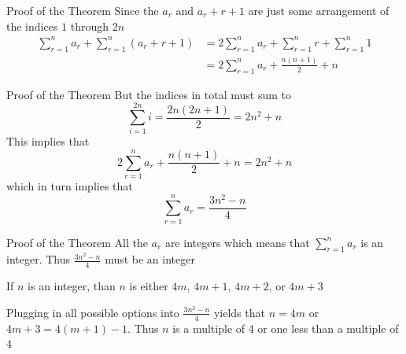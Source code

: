 \documentclass[aspectratio=169]{beamer}
\begin{document}
\begin{frame}{Proof of the Theorem}
    Since the $a_r$ and $a_r + r + 1$ are just some arrangement of the indices $1$ through $2n$
    \begin{align*}
        \sum_{r = 1}^n a_r + \sum_{r = 1}^n (a_r + r + 1) &= 2 \sum_{r = 1}^n a_r + \sum_{r = 1}^n r + \sum_{r = 1}^n 1 \\
        &= 2 \sum_{r = 1}^n a_r + \frac{n(n + 1)}{2} + n
    \end{align*}
\end{frame}

\begin{frame}{Proof of the Theorem}
    But the indices in total must sum to
    \[
        \sum_{i = 1}^{2n} i = \frac{2n(2n + 1)}{2} = 2n^2 + n
    \] \pause
    This implies that
    \[
        2 \sum_{r = 1}^n a_r + \frac{n(n + 1)}{2} + n = 2n^2 + n
    \] \pause
    which in turn implies that
    \[
        \sum_{r = 1}^n a_r = \frac{3n^2 - n}{4}
    \]
\end{frame}

\begin{frame}{Proof of the Theorem}
    All the $a_r$ are integers which means that $\sum_{r = 1}^n a_r$ is an integer. Thus $\frac{3n^2 - n}{4}$ must be an integer
    \vspace{20pt}
    \pause
    
    If $n$ is an integer, than $n$ is either $4m$, $4m + 1$, $4m + 2$, or $4m + 3$
    \vspace{20pt}
    \pause
    
    Plugging in all possible options into $\frac{3n^2 - n}{4}$ yields that $n = 4m$ or $4m + 3 = 4(m + 1) - 1$. Thus $n$ is a multiple of 4 or one less than a multiple of 4
\end{frame}
\end{document}
